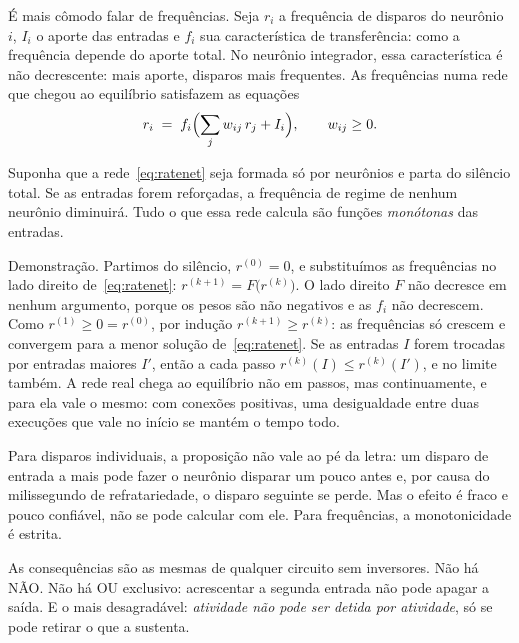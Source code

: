 É mais cômodo falar de frequências. Seja $r_i$ a frequência de disparos do neurônio $i$, $I_i$ o aporte das entradas e $f_i$ sua característica de transferência: como a frequência depende do aporte total. No neurônio integrador, essa característica é não decrescente: mais aporte, disparos mais frequentes. As frequências numa rede que chegou ao equilíbrio satisfazem as equações
\begin{equation}
r_i \;=\; f_i\Bigl(\sum_j w_{ij}\,r_j + I_i\Bigr), \qquad w_{ij}\ge 0 .
\label{eq:ratenet}
\end{equation}

\begin{keyblock}
\begin{proposition}[Monotonicidade]
\label{prop:monotone}
Suponha que a rede~\eqref{eq:ratenet} seja formada só por neurônios  e parta do silêncio total. Se as entradas forem reforçadas, a frequência de regime de nenhum neurônio diminuirá. Tudo o que essa rede calcula são funções \emph{monótonas} das entradas.
\end{proposition}
\end{keyblock}

Demonstração. Partimos do silêncio, $r^{(0)}=0$, e substituímos as frequências no lado direito de~\eqref{eq:ratenet}: $r^{(k+1)}=F\bigl(r^{(k)}\bigr)$. O lado direito $F$ não decresce em nenhum argumento, porque os pesos são não negativos e as $f_i$ não decrescem. Como $r^{(1)}\ge0=r^{(0)}$, por indução $r^{(k+1)}\ge r^{(k)}$: as frequências só crescem e convergem para a menor solução de~\eqref{eq:ratenet}. Se as entradas $I$ forem trocadas por entradas maiores $I'$, então a cada passo $r^{(k)}(I)\le r^{(k)}(I')$, e no limite também. A rede real chega ao equilíbrio não em passos, mas continuamente, e para ela vale o mesmo: com conexões positivas, uma desigualdade entre duas execuções que vale no início se mantém o tempo todo.

Para disparos individuais, a proposição não vale ao pé da letra: um disparo de entrada a mais pode fazer o neurônio disparar um pouco antes e, por causa do milissegundo de refratariedade, o disparo seguinte se perde. Mas o efeito é fraco e pouco confiável, não se pode calcular com ele. Para frequências, a monotonicidade é estrita.

As consequências são as mesmas de qualquer circuito sem inversores. Não há NÃO. Não há OU exclusivo: acrescentar a segunda entrada não pode apagar a saída. E o mais desagradável: \emph{atividade não pode ser detida por atividade}, só se pode retirar o que a sustenta.

